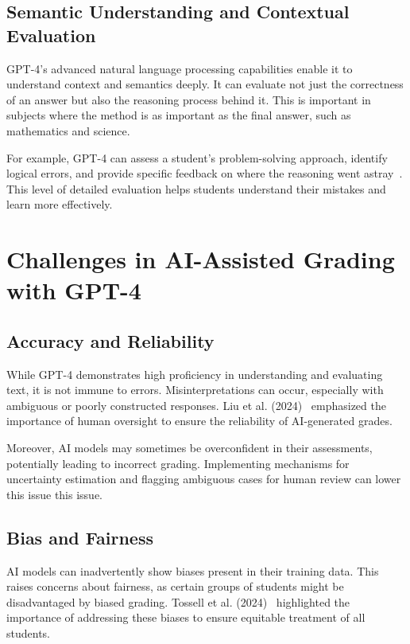 \documentclass[ms,twoside,print]{nuthesis}
\begin{document}
\subsection{Semantic Understanding and Contextual Evaluation}

GPT-4's advanced natural language processing capabilities enable it to understand context and semantics deeply. It can evaluate not just the correctness of an answer but also the reasoning process behind it. This is important in subjects where the method is as important as the final answer, such as mathematics and science.

For example, GPT-4 can assess a student's problem-solving approach, identify logical errors, and provide specific feedback on where the reasoning went astray~\cite{Alto2023}. This level of detailed evaluation helps students understand their mistakes and learn more effectively.

\section{Challenges in AI-Assisted Grading with GPT-4}

\subsection{Accuracy and Reliability}

While GPT-4 demonstrates high proficiency in understanding and evaluating text, it is not immune to errors. Misinterpretations can occur, especially with ambiguous or poorly constructed responses. Liu et al. (2024)~\cite{Liu2024} emphasized the importance of human oversight to ensure the reliability of AI-generated grades.

Moreover, AI models may sometimes be overconfident in their assessments, potentially leading to incorrect grading. Implementing mechanisms for uncertainty estimation and flagging ambiguous cases for human review can lower this issue this issue.

\subsection{Bias and Fairness}

AI models can inadvertently show biases present in their training data. This raises concerns about fairness, as certain groups of students might be disadvantaged by biased grading. Tossell et al. (2024)~\cite{Tossell2024} highlighted the importance of addressing these biases to ensure equitable treatment of all students.
\end{document}
